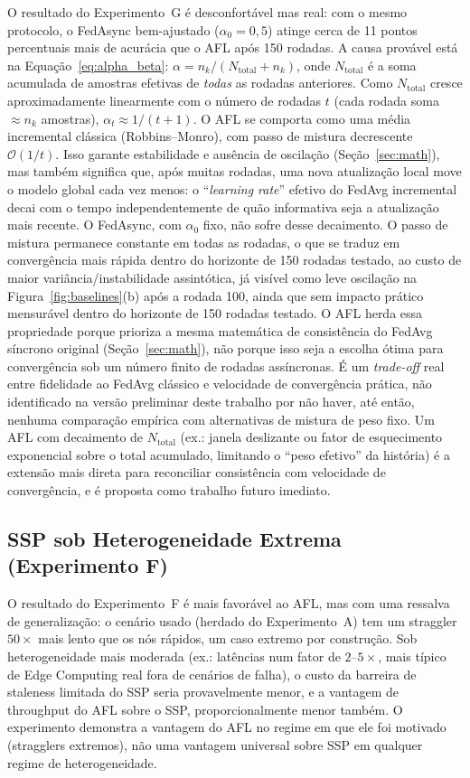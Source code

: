 \documentclass[conference,a4paper]{IEEEtran}
\begin{document}
O resultado do Experimento~G é desconfortável mas real: com o mesmo
protocolo, o FedAsync bem-ajustado ($\alpha_0=0{,}5$) atinge cerca de 11
pontos percentuais mais de acurácia que o AFL após 150 rodadas. A causa provável
está na Equação~\ref{eq:alpha_beta}:
$\alpha = n_k/(N_{\text{total}}+n_k)$, onde $N_{\text{total}}$ é a soma
acumulada de amostras efetivas de \emph{todas} as rodadas anteriores. Como
$N_{\text{total}}$ cresce aproximadamente linearmente com o número de
rodadas $t$ (cada rodada soma $\approx n_k$ amostras), $\alpha_t \approx
1/(t+1)$. O AFL se comporta como uma média incremental clássica
(Robbins--Monro), com passo de mistura decrescente $\mathcal{O}(1/t)$. Isso
garante estabilidade e ausência de oscilação (Seção~\ref{sec:math}), mas
também significa que, após muitas rodadas, uma nova atualização local move
o modelo global cada vez menos: o ``\textit{learning rate}'' efetivo do
FedAvg incremental decai com o tempo independentemente de quão informativa
seja a atualização mais recente. O FedAsync, com $\alpha_0$ fixo, não sofre
desse decaimento. O passo de mistura permanece constante em todas as
rodadas, o que se traduz em convergência mais rápida dentro do horizonte de
150 rodadas testado, ao custo de maior variância/instabilidade
assintótica, já visível como leve oscilação na Figura~\ref{fig:baselines}(b)
após a rodada 100, ainda que sem impacto prático mensurável dentro do
horizonte de 150 rodadas testado. O AFL herda essa
propriedade porque prioriza a mesma matemática de consistência do FedAvg
síncrono original (Seção~\ref{sec:math}), não porque isso seja a escolha
ótima para convergência sob um número finito de rodadas assíncronas. É
um \textit{trade-off} real entre fidelidade ao FedAvg clássico e velocidade
de convergência prática, não identificado na versão preliminar deste
trabalho por não haver, até então, nenhuma comparação empírica com
alternativas de mistura de peso fixo. Um AFL com decaimento de
$N_{\text{total}}$ (ex.: janela deslizante ou fator de esquecimento
exponencial sobre o total acumulado, limitando o ``peso efetivo'' da
história) é a extensão mais direta para reconciliar consistência com
velocidade de convergência, e é proposta como trabalho futuro imediato.

\subsection{SSP sob Heterogeneidade Extrema (Experimento F)}

O resultado do Experimento~F é mais favorável ao AFL, mas com uma ressalva
de generalização: o cenário usado (herdado do Experimento~A) tem um
straggler $50\times$ mais lento que os nós rápidos, um caso extremo por
construção. Sob heterogeneidade mais moderada (ex.: latências num fator de
$2$--$5\times$, mais típico de Edge Computing real fora de cenários de
falha), o custo da barreira de staleness limitada do SSP seria
provavelmente menor, e a vantagem de throughput do AFL sobre o SSP,
proporcionalmente menor também. O experimento demonstra a vantagem do AFL
no regime em que ele foi motivado (stragglers extremos), não uma vantagem
universal sobre SSP em qualquer regime de heterogeneidade.
\end{document}
